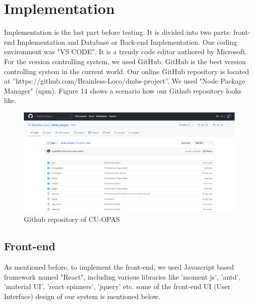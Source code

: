 \section{Implementation}\label{sec:imp}
Implementation is the last part before testing. It is divided into two parts: front-end Implementation and Database or Back-end Implementation. Our coding environment was "VS CODE". It is a trendy code editor authored by Microsoft. For the version controlling system, we used GitHub. GitHub is the best version controlling system in the current world. Our online GitHub repository is located at ''https://github.com/Brainless-Loco/dmbs-project''. We used "Node Package Manager" (npm). Figure 14 shows a scenario how our Github repository looks like.
\begin{figure}[H]
	\includegraphics[width=1\textwidth]{images/github}
	\caption{Github repository of CU-OPAS}
\end{figure}

\subsection{Front-end}\label{sub:frontend}
As mentioned before, to implement the front-end, we used Javascript based framework named "React", including various libraries like 'moment js', 'antd', 'material UI', 'react spinners', 'jquery' etc. some of the front-end UI (User Interface) design of our system is mentioned below.

